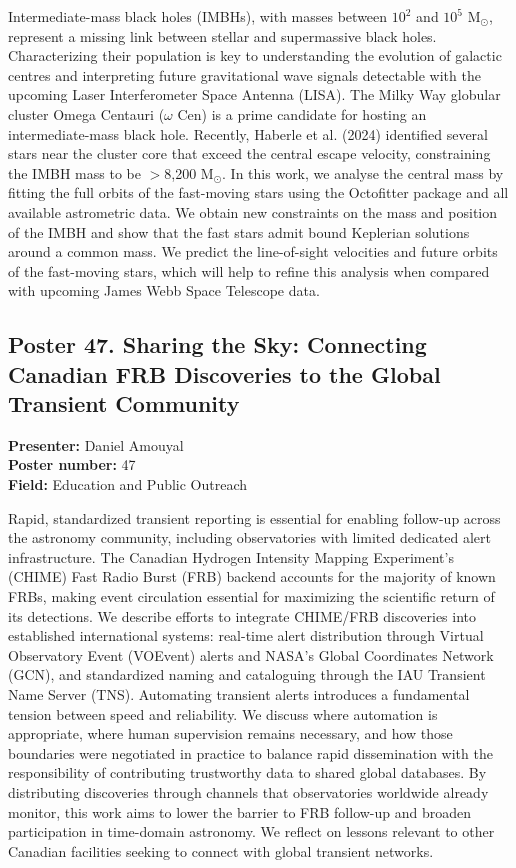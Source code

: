 Intermediate-mass black holes (IMBHs), with masses between $10^2$ and $10^5$ M$_\odot$, represent a missing link between stellar and supermassive black holes. Characterizing their population is key to understanding the evolution of galactic centres and interpreting future gravitational wave signals detectable with the upcoming Laser Interferometer Space Antenna (LISA). The Milky Way globular cluster Omega Centauri ($\omega$ Cen) is a prime candidate for hosting an intermediate-mass black hole. Recently, Haberle et al. (2024) identified several stars near the cluster core that exceed the central escape velocity, constraining the IMBH mass to be $>$8,200 M$_\odot$. In this work, we analyse the central mass by fitting the full orbits of the fast-moving stars using the Octofitter package and all available astrometric data. We obtain new constraints on the mass and position of the IMBH and show that the fast stars admit bound Keplerian solutions around a common mass. We predict the line-of-sight velocities and future orbits of the fast-moving stars, which will help to refine this analysis when compared with upcoming James Webb Space Telescope data.

\hypertarget{poster-abstract-talk-96}{}\label{poster-abstract-page-talk-96}
\subsection*{Poster 47. Sharing the Sky: Connecting Canadian FRB Discoveries to the Global Transient Community}
\textbf{Presenter:} Daniel Amouyal\\
\textbf{Poster number:} 47\\
\textbf{Field:} Education and Public Outreach

Rapid, standardized transient reporting is essential for enabling follow-up across the astronomy community, including observatories with limited dedicated alert infrastructure. The Canadian Hydrogen Intensity Mapping Experiment's (CHIME) Fast Radio Burst (FRB) backend accounts for the majority of known FRBs, making event circulation essential for maximizing the scientific return of its detections. We describe efforts to integrate CHIME/FRB discoveries into established international systems: real-time alert distribution through Virtual Observatory Event (VOEvent) alerts and NASA's Global Coordinates Network (GCN), and standardized naming and cataloguing through the IAU Transient Name Server (TNS). Automating transient alerts introduces a fundamental tension between speed and reliability. We discuss where automation is appropriate, where human supervision remains necessary, and how those boundaries were negotiated in practice to balance rapid dissemination with the responsibility of contributing trustworthy data to shared global databases. By distributing discoveries through channels that observatories worldwide already monitor, this work aims to lower the barrier to FRB follow-up and broaden participation in time-domain astronomy. We reflect on lessons relevant to other Canadian facilities seeking to connect with global transient networks.

